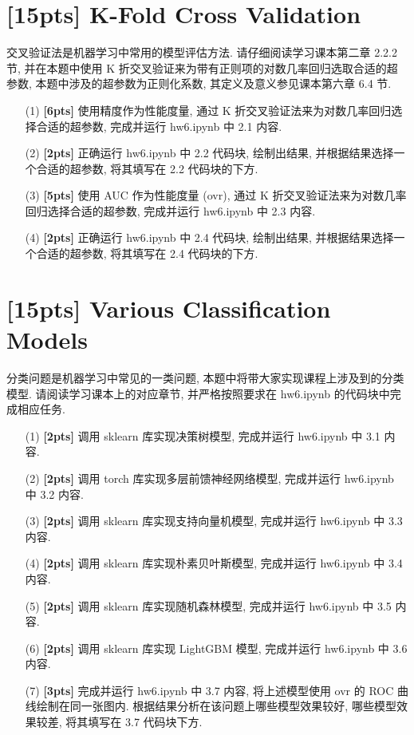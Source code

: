 \documentclass[a4paper,UTF8]{article}
\numberwithin{equation}{section}
\numberwithin{equation}{section}
\theoremstyle{definition}
\begin{document}
\newpage

\section{[15pts] K-Fold Cross Validation}\label{sec2}
交叉验证法是机器学习中常用的模型评估方法. 请仔细阅读学习课本第二章 2.2.2 节, 并在本题中使用 K 折交叉验证来为带有正则项的对数几率回归选取合适的超参数, 本题中涉及的超参数为正则化系数, 其定义及意义参见课本第六章 6.4 节.

\begin{enumerate}
    \item[(1)] \textbf{[6pts]} 使用精度作为性能度量, 通过 K 折交叉验证法来为对数几率回归选择合适的超参数,  完成并运行 hw6.ipynb 中 2.1 内容. 
    \item[(2)] \textbf{[2pts]} 正确运行 hw6.ipynb 中 2.2 代码块, 绘制出结果, 并根据结果选择一个合适的超参数, 将其填写在 2.2 代码块的下方.
    \item[(3)] \textbf{[5pts]} 使用 AUC 作为性能度量 (ovr), 通过 K 折交叉验证法来为对数几率回归选择合适的超参数,  完成并运行 hw6.ipynb 中 2.3 内容. 
    \item[(4)] \textbf{[2pts]} 正确运行 hw6.ipynb 中 2.4 代码块, 绘制出结果, 并根据结果选择一个合适的超参数, 将其填写在 2.4 代码块的下方. 
\end{enumerate}

\newpage

\section{[15pts] Various Classification Models}\label{sec3}
分类问题是机器学习中常见的一类问题, 本题中将带大家实现课程上涉及到的分类模型. 请阅读学习课本上的对应章节, 并严格按照要求在 hw6.ipynb 的代码块中完成相应任务.

\begin{enumerate}
    \item[(1)] \textbf{[2pts]} 调用 sklearn 库实现决策树模型, 完成并运行 hw6.ipynb 中 3.1 内容. 
    \item[(2)] \textbf{[2pts]} 调用 torch 库实现多层前馈神经网络模型, 完成并运行 hw6.ipynb 中 3.2 内容. 
    \item[(3)] \textbf{[2pts]} 调用 sklearn 库实现支持向量机模型, 完成并运行 hw6.ipynb 中 3.3 内容.
    \item[(4)] \textbf{[2pts]} 调用 sklearn 库实现朴素贝叶斯模型, 完成并运行 hw6.ipynb 中 3.4 内容.
    \item[(5)] \textbf{[2pts]} 调用 sklearn 库实现随机森林模型, 完成并运行 hw6.ipynb 中 3.5 内容.
    \item[(6)] \textbf{[2pts]} 调用 sklearn 库实现 LightGBM 模型, 完成并运行 hw6.ipynb 中 3.6 内容.
    \item[(7)] \textbf{[3pts]} 完成并运行 hw6.ipynb 中 3.7 内容, 将上述模型使用 ovr 的 ROC 曲线绘制在同一张图内. 根据结果分析在该问题上哪些模型效果较好, 哪些模型效果较差, 将其填写在 3.7 代码块下方. 
\end{enumerate}
\end{document}
